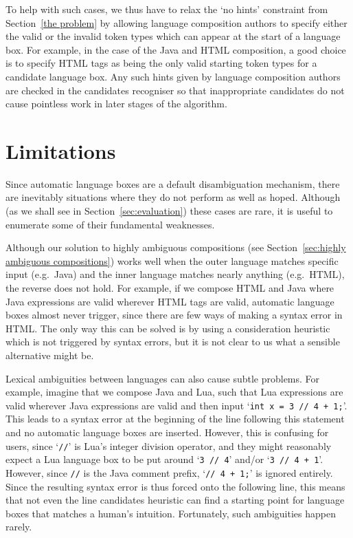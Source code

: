 \documentclass[sigplan,screen]{acmart}\settopmatter{printfolios=true,printccs=false,printacmref=false}
\begin{document}
To help with such cases, we thus have to relax the `no hints' constraint from
Section~\ref{the problem} by allowing language composition authors to specify
either the valid or the invalid token types which can appear at the start of
a language box. For example, in the case of the Java and HTML composition, a
good choice is to specify HTML tags as being the only valid starting token
types for a candidate language box. Any such hints given by language composition authors
are checked in the candidates recogniser so that inappropriate candidates do
not cause pointless work in later stages of the algorithm.


\section{Limitations}
\label{sec:lbox_limitations}

Since automatic language boxes are a default disambiguation mechanism,
there are inevitably situations where they do not perform as well as hoped.
Although (as we shall see in Section~\ref{sec:evaluation}) these cases are
rare, it is useful to enumerate some of their fundamental weaknesses.

Although our solution to highly ambiguous compositions (see Section~\ref{sec:highly
ambiguous compositions}) works well when the outer language matches specific
input (e.g.~Java) and the inner language matches nearly anything (e.g.~HTML),
the reverse does not hold. For example, if we compose HTML and Java where
Java expressions are valid wherever HTML tags are valid, automatic language
boxes almost never trigger, since there are few ways of making a syntax error
in HTML. The only way this can be solved is by using a consideration
heuristic which is not triggered by syntax errors, but it is not clear to
us what a sensible alternative might be.

Lexical ambiguities between languages can also cause subtle problems. For
example, imagine that we compose Java and Lua, such that Lua expressions are
valid wherever Java expressions are valid and then input `\texttt{int x = 3 //
4 + 1;}'. This leads to a syntax error at the beginning of the line following
this statement and no automatic language boxes are inserted. However, this is
confusing for users, since `\texttt{//}' is Lua's integer division operator,
and they might reasonably expect a Lua language box to be put around `\texttt{3
// 4}' and/or `\texttt{3 // 4 + 1}'. However, since \texttt{//} is the Java
comment prefix, `\texttt{// 4 + 1;}' is ignored entirely. Since the resulting
syntax error is thus forced onto the following line, this means that not even
the line candidates heuristic can find a starting point for language boxes that
matches a human's intuition. Fortunately, such ambiguities happen
rarely.
\end{document}
